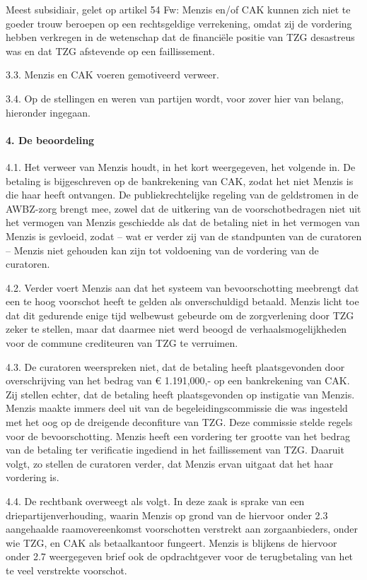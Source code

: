 \documentclass[
  dutch,
  a4paper,
]{article}
\begin{document}
Meest subsidiair, gelet op artikel 54 Fw: Menzis en/of CAK kunnen zich niet te goeder trouw beroepen op een rechtsgeldige verrekening, omdat zij de vordering hebben verkregen in de wetenschap dat de financiële positie van TZG desastreus was en dat TZG afstevende op een faillissement.

3.3. Menzis en CAK voeren gemotiveerd verweer.

3.4. Op de stellingen en weren van partijen wordt, voor zover hier van belang, hieronder ingegaan.

\paragraph{4. De beoordeling}\label{de-beoordeling-5}

4.1. Het verweer van Menzis houdt, in het kort weergegeven, het volgende in. De betaling is bijgeschreven op de bankrekening van CAK, zodat het niet Menzis is die haar heeft ontvangen. De publiekrechtelijke regeling van de geldstromen in de AWBZ-zorg brengt mee, zowel dat de uitkering van de voorschotbedragen niet uit het vermogen van Menzis geschiedde als dat de betaling niet in het vermogen van Menzis is gevloeid, zodat -- wat er verder zij van de standpunten van de curatoren -- Menzis niet gehouden kan zijn tot voldoening van de vordering van de curatoren.

4.2. Verder voert Menzis aan dat het systeem van bevoorschotting meebrengt dat een te hoog voorschot heeft te gelden als onverschuldigd betaald. Menzis licht toe dat dit gedurende enige tijd welbewust gebeurde om de zorgverlening door TZG zeker te stellen, maar dat daarmee niet werd beoogd de verhaalsmogelijkheden voor de commune crediteuren van TZG te verruimen.

4.3. De curatoren weerspreken niet, dat de betaling heeft plaatsgevonden door overschrijving van het bedrag van € 1.191,000,- op een bankrekening van CAK. Zij stellen echter, dat de betaling heeft plaatsgevonden op instigatie van Menzis. Menzis maakte immers deel uit van de begeleidingscommissie die was ingesteld met het oog op de dreigende deconfiture van TZG. Deze commissie stelde regels voor de bevoorschotting. Menzis heeft een vordering ter grootte van het bedrag van de betaling ter verificatie ingediend in het faillissement van TZG. Daaruit volgt, zo stellen de curatoren verder, dat Menzis ervan uitgaat dat het haar vordering is.

4.4. De rechtbank overweegt als volgt. In deze zaak is sprake van een driepartijenverhouding, waarin Menzis op grond van de hiervoor onder 2.3 aangehaalde raamovereenkomst voorschotten verstrekt aan zorgaanbieders, onder wie TZG, en CAK als betaalkantoor fungeert. Menzis is blijkens de hiervoor onder 2.7 weergegeven brief ook de opdrachtgever voor de terugbetaling van het te veel verstrekte voorschot.
\end{document}
